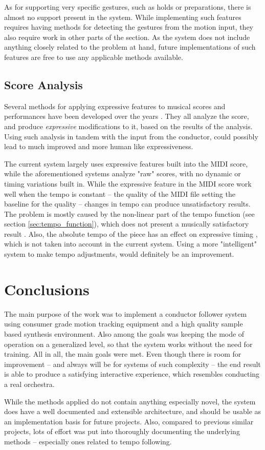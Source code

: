 As for supporting very specific gestures,
such as holds or preparations,
there is almost no support present in the system.
While implementing such features requires
having methods for detecting the gestures
from the motion input,
they also require work in other parts of the section.
As the system does not include anything
closely related to the problem at hand,
future implementations of such features
are free to use any applicable methods available.

\subsection{Score Analysis}

Several methods for applying expressive features
to musical scores and performances
have been developed over the years \cite{Kirke2012}.
They all analyze the score,
and produce \textit{expressive} modifications to it,
based on the results of the analysis.
Using such analysis in tandem with
the input from the conductor,
could possibly lead to much improved and
more human like expressiveness.

The current system largely uses expressive features
built into the MIDI score,
while the aforementioned systems analyze "raw" scores,
with no dynamic or timing variations built in.
While the expressive feature in the MIDI score
work well when the tempo is constant --
the quality of the MIDI file setting the baseline for the quality --
changes in tempo can produce unsatisfactory results.
The problem is mostly caused by the
non-linear part of the tempo function
(see section \ref{sec:tempo_function}),
which does not present a musically
satisfactory result \cite{Kirke2012, Desain1993}.
Also, the absolute tempo of the piece has an effect
on expressive timing \cite{Desain1994},
which is not taken into account in the current system.
Using a more "intelligent" system to make tempo adjustments,
would definitely be an improvement.

\section{Conclusions}

The main purpose of the work was to
implement a conductor follower system
using consumer grade motion tracking equipment
and a high quality sample based synthesis environment.
Also among the goals was
keeping the mode of operation on a generalized level,
so that the system works without the need for training.
All in all, the main goals were met.
Even though there is room for improvement --
and always will be for systems of such complexity --
the end result is able to produce
a satisfying interactive experience,
which resembles conducting a real orchestra.

While the methods applied
do not contain anything especially novel,
the system does have a well documented
and extensible architecture,
and should be usable as an implementation
basis for future projects.
Also, compared to previous similar projects,
lots of effort was put into
thoroughly documenting the underlying methods --
especially ones related to tempo following.


